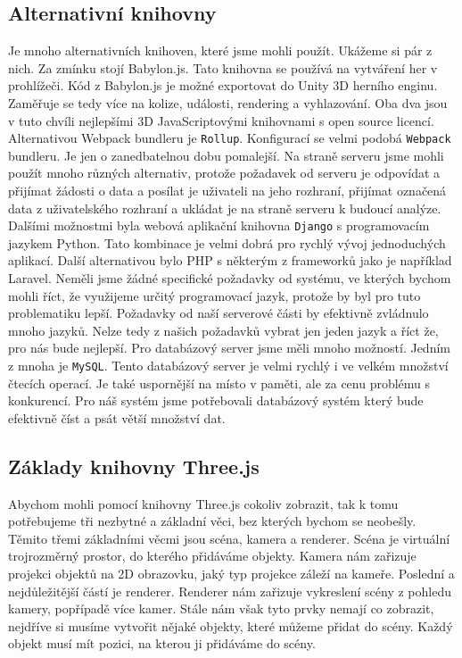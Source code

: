 \documentclass[czech,bachelor,dept420,male,cpdeclaration]{diploma}
\begin{document}
\subsection{Alternativní knihovny}
Je mnoho alternativních knihoven, které jsme mohli použít. Ukážeme si pár z nich. Za zmínku stojí Babylon.js. Tato knihovna se používá na vytváření her v prohlížeči. Kód z Babylon.js je možné exportovat do Unity 3D herního enginu. Zaměřuje se tedy více na kolize, události, rendering a vyhlazování. Oba dva jsou v tuto chvíli nejlepšími 3D JavaScriptovými knihovnami s open source licencí. Alternativou Webpack bundleru je \texttt{Rollup}. Konfigurací se velmi podobá \texttt{Webpack} bundleru. Je jen o zanedbatelnou dobu pomalejší.
Na straně serveru jsme mohli použít mnoho různých alternativ, protože požadavek od serveru je odpovídat a přijímat žádosti o data a posílat je uživateli na jeho rozhraní, přijímat označená data z uživatelského rozhraní a ukládat je na straně serveru k budoucí analýze. Dalšími možnostmi byla webová aplikační knihovna \texttt{Django} s programovacím jazykem Python. Tato kombinace je velmi dobrá pro rychlý vývoj jednoduchých aplikací. Další alternativou bylo PHP s některým z frameworků jako je například Laravel. Neměli jsme žádné specifické požadavky od systému, ve kterých bychom mohli říct, že využijeme určitý programovací jazyk, protože by byl pro tuto problematiku lepší. Požadavky od naší serverové části by efektivně zvládnulo mnoho jazyků. Nelze tedy z našich požadavků vybrat jen jeden jazyk a říct že, pro nás bude nejlepší. Pro databázový server jsme měli mnoho možností. Jedním z mnoha je \texttt{MySQL}. Tento databázový server je velmi rychlý i ve velkém množství čtecích operací. Je také uspornější na místo v paměti, ale za cenu problému s konkurencí. Pro náš systém jsme potřebovali databázový systém který bude efektivně číst a psát větší množství dat.



\subsection{Základy knihovny Three.js}
Abychom mohli pomocí knihovny Three.js cokoliv zobrazit, tak k tomu potřebujeme tři nezbytné a základní věci, bez kterých bychom se neobešly. Těmito třemi základními věcmi jsou scéna, kamera a renderer. Scéna je virtuální trojrozměrný prostor, do kterého přidáváme objekty. Kamera nám zařizuje projekci objektů na 2D obrazovku, jaký typ projekce záleží na kameře. Poslední a nejdůležitější částí je renderer. Renderer nám zařizuje vykreslení scény z pohledu kamery, popřípadě více kamer. Stále nám však tyto prvky nemají co zobrazit, nejdříve si musíme vytvořit nějaké objekty, které můžeme přidat do scény. Každý objekt musí mít pozici, na kterou ji přidáváme do scény.
\end{document}
